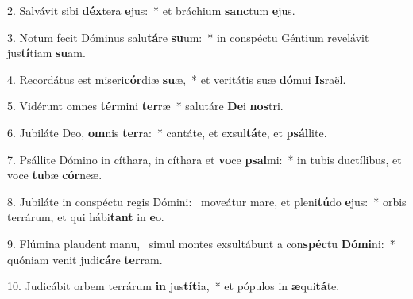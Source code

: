 2. Salvávit sibi \textbf{déx}tera \textbf{e}jus:~*  et bráchium \textbf{sanc}tum \textbf{e}jus.\

3. Notum fecit Dóminus salu\textbf{tá}re \textbf{su}um:~*  in conspéctu Géntium revelávit jus\textbf{tí}tiam \textbf{su}am.\

4. Recordátus est miseri\textbf{cór}diæ \textbf{su}æ,~*  et veritátis suæ \textbf{dó}mui \textbf{Is}raël.\

5. Vidérunt omnes \textbf{tér}mini \textbf{ter}ræ~*  salutáre \textbf{De}i \textbf{nos}tri.\

6. Jubiláte Deo, \textbf{om}nis \textbf{ter}ra:~*  cantáte, et exsul\textbf{tá}te, et \textbf{psál}lite.\

7. Psállite Dómino in cíthara, in cíthara et \textbf{vo}ce \textbf{psal}mi:~*  in tubis ductílibus, et voce \textbf{tu}bæ \textbf{cór}neæ.\

8. Jubiláte in conspéctu regis Dómini: \dag\  moveátur mare, et pleni\textbf{tú}do \textbf{e}jus:~*  orbis terrárum, et qui hábi\textbf{tant} in \textbf{e}o.\

9. Flúmina plaudent manu, \dag\  simul montes exsultábunt a con\textbf{spéc}tu \textbf{Dó}\textbf{mi}ni:~*  quóniam venit judi\textbf{cá}re \textbf{ter}ram.\

10. Judicábit orbem terrárum \textbf{in} jus\textbf{tí}\textbf{ti}a,~*  et pópulos in \textbf{æ}qui\textbf{tá}te.\

